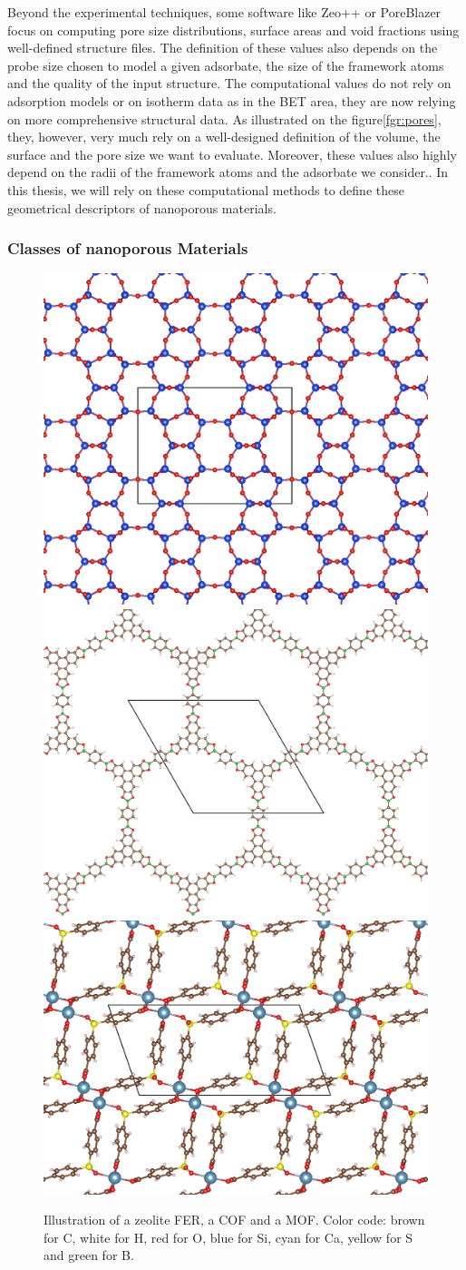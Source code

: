 \documentclass[main.tex]{subfiles}
\begin{document}
Beyond the experimental techniques, some software like Zeo++ or PoreBlazer focus on computing pore size distributions, surface areas and void fractions using well-defined structure files.\cite{Zeo++,PoreBlazer} The definition of these values also depends on the probe size chosen to model a given adsorbate, the size of the framework atoms and the quality of the input structure. The computational values do not rely on adsorption models or on isotherm data as in the BET area, they are now relying on more comprehensive structural data. As illustrated on the figure\ref{fgr:pores}, they, however, very much rely on a well-designed definition of the volume, the surface and the pore size we want to evaluate. Moreover, these values also highly depend on the radii of the framework atoms and the adsorbate we consider.\cite{Hung_2021}. In this thesis, we will rely on these computational methods to define these geometrical descriptors of nanoporous materials.

\subsubsection{Classes of nanoporous Materials}

\begin{figure}[ht]
  \centering
  \includegraphics[height=0.23\textwidth]{figures/1-screening/FER.jpg}
  \includegraphics[height=0.23\textwidth]{figures/1-screening/COF-5.jpg}
  \includegraphics[height=0.23\textwidth]{figures/1-screening/SBMOF-1.jpg}
  \caption{Illustration of a zeolite FER\cite{FER}, a COF\cite{Cote_2005} and a MOF\cite{KAXQIL}. Color code: brown for C, white for H, red for O, blue for Si, cyan for Ca, yellow for S and green for B.}
\end{figure}
\end{document}
